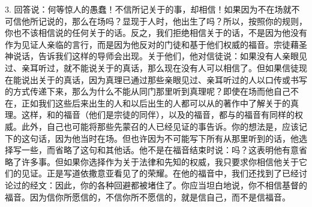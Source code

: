 3. 回答说：何等惊人的愚蠢！不信所记关于的事，却相信！如果因为不在场就不可信他所记说的，那么在场吗？显现于人时，他出生了吗？所以，按照你的规则，你也不该相信说的任何关于的话。反之，我们拒绝相信关于的话，不是因为他没有作为见证人亲临的言行，而是因为他反对的门徒和基于他们权威的福音。宗徒藉圣神说话，告诉我们这样的导师会出现。关于他们，他对信徒说：如果没有人亲眼见过、亲耳听过，就不能说关于的真话，那么现在没有人可以相信了。但如果信徒现在能说出关于的真话，因为真理已通过那些亲眼见过、亲耳听过的人以口传或书写的方式传递下来，那么为什么不能从同门那里听到真理呢？即使在场而他自己不在，正如我们这些后来出生的人和以后出生的人都可以从的著作中了解关于的真理。这样，和的福音（他们是宗徒的同伴），以及的福音，都与的福音有同样的权威。此外，自己也可能将那些先蒙召的人已经见证的事告诉。你的想法是，应该记下的这句话，因为他当时在场。但也许因为不可能写下所有从那里听到的话，他选择写一些，而省略了这句和其他话。他不是在福音结束时说：吗？这表明他有意省略了许多事。但如果你选择作为关于法律和先知的权威，我只要求你相信他关于它们的见证。正是写道依撒意亚看见了的荣耀。在他的福音中，我们还找到了已经讨论过的经文：因此，你的各种回避都被堵住了。你应当坦白地说，你不相信基督的福音。因为信你所愿信的，不信你所不愿信的，就是信自己，而不是信福音。\par


